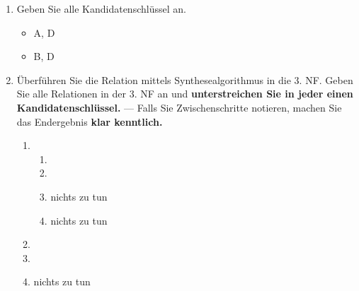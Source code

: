 \documentclass{lehramt-informatik-aufgabe}
\begin{document}
\begin{enumerate}


\item Geben Sie alle Kandidatenschlüssel an.

\begin{liAntwort}
\begin{itemize}
\item A, D
\item B, D
\end{itemize}
\end{liAntwort}


\item Überführen Sie die Relation mittels Synthesealgorithmus in die 3.
NF. Geben Sie alle Relationen in der 3. NF an und \textbf{unterstreichen
Sie in jeder einen Kandidatenschlüssel.} — Falls Sie Zwischenschritte
notieren, machen Sie das Endergebnis \textbf{klar kenntlich.}

\begin{liAntwort}
\begin{enumerate}
\item {}
\begin{enumerate}
\item {}


\item {}


\item {}

nichts zu tun

\item {}

nichts zu tun

\end{enumerate}
\item {}


\item {}


\item {}

nichts zu tun
\end{enumerate}
\end{liAntwort}

\end{enumerate}
\end{document}

